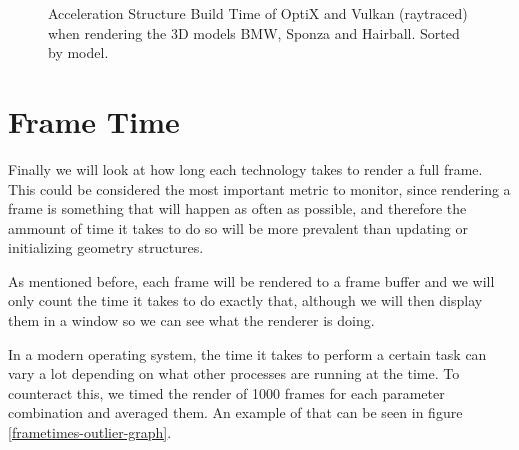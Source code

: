 \begin{figure}
    \caption{Acceleration Structure Build Time of OptiX and Vulkan (raytraced) when rendering the 3D models BMW, Sponza and Hairball. Sorted by model.}
    \label{as-build-time-geometry-comparison-graph}
\end{figure}

\clearpage
\section{Frame Time}
Finally we will look at how long each technology takes to render a full frame. This could be considered the most important metric to monitor, since rendering a frame is something that will happen as often as possible, and therefore the ammount of time it takes to do so will be more prevalent than updating or initializing geometry structures.

As mentioned before, each frame will be rendered to a frame buffer and we will only count the time it takes to do exactly that, although we will then display them in a window so we can see what the renderer is doing.

In a modern operating system, the time it takes to perform a certain task can vary a lot depending on what other processes are running at the time. To counteract this, we timed the render of 1000 frames for each parameter combination and averaged them. An example of that can be seen in figure \ref{frametimes-outlier-graph}.

